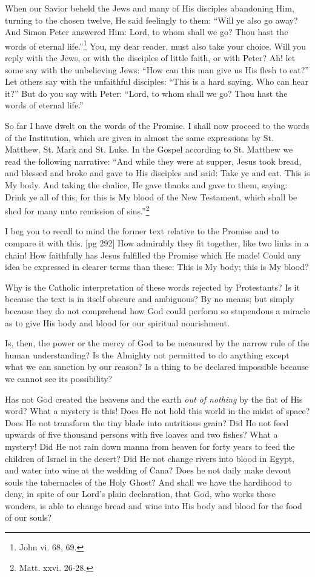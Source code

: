 When our Savior beheld the Jews and many of
His disciples abandoning Him, turning to the
chosen twelve, He said feelingly to them: “Will
ye also go away? And Simon Peter answered
Him: Lord, to whom shall we go? Thou hast the
words of eternal life.”\footnote{John
vi. 68, 69.} You, my dear reader,
must also take your choice. Will you reply with
the Jews, or with the disciples of little faith, or
with Peter? Ah! let some say with the unbelieving
Jews: “How can this man give us His flesh to
eat?” Let others say with the unfaithful disciples:
“This is a hard saying. Who can hear it?”
But do you say with Peter: “Lord, to whom shall
we go? Thou hast the words of eternal life.”

So far I have dwelt on the words of the Promise.
I shall now proceed to the words of the Institution,
which are given in almost the same expressions by
St. Matthew, St. Mark and St. Luke. In the Gospel
according to St. Matthew we read the following
narrative: “And while they were at supper,
Jesus took bread, and blessed and broke and gave
to His disciples and said: Take ye and eat. This
is My body. And taking the chalice, He gave
thanks and gave to them, saying: Drink ye all of
this; for this is My blood of the New Testament,
which shall be shed for many unto remission of
sins.”\footnote{Matt. xxvi. 26-28.}

I beg you to recall to mind the former text relative
to the Promise and to compare it with this.
[pg 292]
How admirably they fit together, like two links in
a chain! How faithfully has Jesus fulfilled the
Promise which He made! Could any idea be expressed
in clearer terms than these: This is My
body; this is My blood?

Why is the Catholic interpretation of these
words rejected by Protestants? Is it because the
text is in itself obscure and ambiguous? By no
means; but simply because they do not comprehend
how God could perform so stupendous a
miracle as to give His body and blood for our
spiritual nourishment.

Is, then, the power or the mercy of God to be
measured by the narrow rule of the human understanding?
Is the Almighty not permitted to do
anything except what we can sanction by our reason?
Is a thing to be declared impossible because
we cannot see its possibility?

Has not God created the heavens and the earth
\emph{out of nothing} by the fiat of His word? What a
mystery is this! Does He not hold this world in
the midst of space? Does He not transform the
tiny blade into nutritious grain? Did He not feed
upwards of five thousand persons with five loaves
and two fishes? What a mystery! Did He not
rain down manna from heaven for forty years to
feed the children of Israel in the desert? Did He
not change rivers into blood in Egypt, and water
into wine at the wedding of Cana? Does he not
daily make devout souls the tabernacles of the
Holy Ghost? And shall we have the hardihood to
deny, in spite of our Lord's plain declaration, that
God, who works these wonders, is able to change
bread and wine into His body and blood for the
food of our souls?

